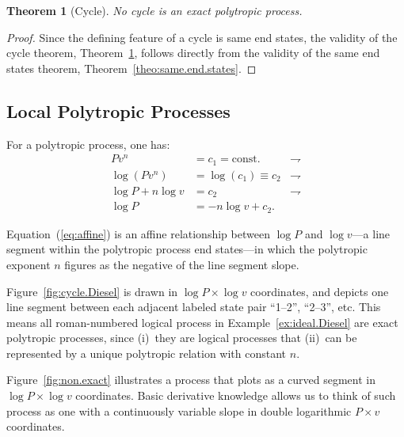 \documentclass[fleqn,10pt]{SelfArx}
\newtheorem{theorem}{Theorem}
\begin{document}
    \begin{theorem}[Cycle]\label{theo:cycle}
        No cycle is an exact polytropic process.
    \end{theorem}

    \begin{proof}
        Since the defining feature of a cycle is same end states,  the  validity  of  the  cycle
        theorem, Theorem~\ref{theo:cycle}, follows directly from the validity of  the  same  end
        states theorem, Theorem~\ref{theo:same.end.states}.
    \end{proof}

    \subsection{Local Polytropic Processes}

    For a polytropic process, one has: %
    \begin{align}
        Pv^n & = c_1 = \text{const.}        & \rightharpoondown\\
        \log(Pv^n) & = \log(c_1) \equiv c_2 & \rightharpoondown\\
        \log P + n\log v & = c_2            & \rightharpoondown\\
        \log P & = -n\log v + c_2. \label{eq:affine}
    \end{align}

    Equation~(\ref{eq:affine}) is an affine relationship between $\log P$ and $\log v$---a  line
    segment within the polytropic process end states---in  which  the  polytropic  exponent  $n$
    figures as the negative of the line segment slope.

    Figure~\ref{fig:cycle.Diesel} is drawn in $\log P \times \log v$  coordinates,  and  depicts
    one line segment between each adjacent labeled state  pair  ``1--2'',  ``2--3'',  etc.  This
    means  all  roman-numbered  logical  process  in  Example~\ref{ex:ideal.Diesel}  are   exact
    polytropic processes, since (i)~they are logical processes that (ii)~can be represented by a
    unique polytropic relation with constant $n$.

    Figure~\ref{fig:non.exact} illustrates a process that plots as a curved segment in  $\log  P
    \times \log v$ coordinates. Basic derivative knowledge allows us to think of such process as
    one with a continuously variable slope in double logarithmic $P\times v$ coordinates.
\end{document}
